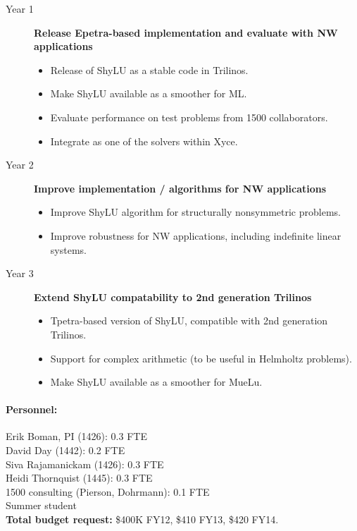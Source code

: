\documentclass[10pt]{amsart}
\begin{document}
\begin{description}
\item[Year 1] {\bf Release Epetra-based implementation and evaluate with NW applications}
  \begin{itemize} 
  \item Release of ShyLU as a stable code in Trilinos.
  \item Make ShyLU available as a smoother for ML.
  \item Evaluate performance on test problems from 1500 collaborators.
  \item Integrate as one of the solvers within Xyce.
  \end{itemize}
\item[Year 2] {\bf Improve implementation / algorithms for NW applications}
  \begin{itemize}
  \item Improve ShyLU algorithm for structurally nonsymmetric problems.
  \item Improve robustness for NW applications, including indefinite linear systems.
  \end{itemize}
\item[Year 3] {\bf Extend ShyLU compatability to 2nd generation Trilinos}
  \begin{itemize}
  \item Tpetra-based version of ShyLU, compatible with 2nd generation Trilinos.
  \item Support for complex arithmetic (to be useful in Helmholtz problems).
  \item Make ShyLU available as a smoother for MueLu.
  \end{itemize}
\end{description}


\paragraph{\bf Personnel:}
Erik Boman, PI (1426): 0.3 FTE\\
David Day (1442): 0.2 FTE\\
Siva Rajamanickam (1426): 0.3 FTE\\
Heidi Thornquist (1445): 0.3 FTE\\
1500 consulting (Pierson, Dohrmann): 0.1 FTE\\
Summer student\\
%
\textbf{Total budget request:} \$400K FY12, \$410 FY13, \$420 FY14.
\end{document}
